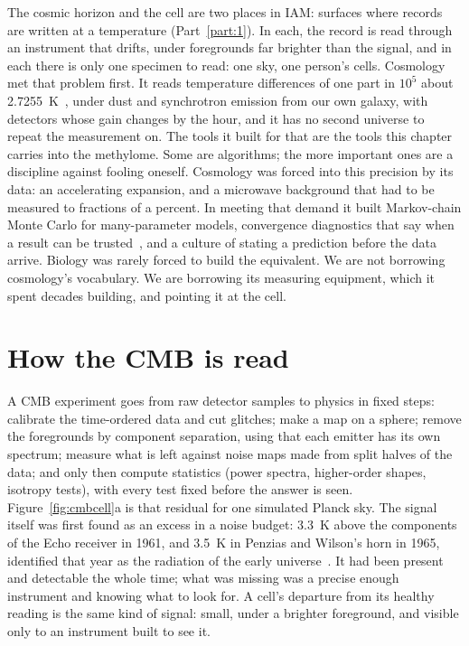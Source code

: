 The cosmic horizon and the cell are two places in IAM: surfaces where records are written at a temperature (Part~\ref{part:1}). In each, the record is
read through an instrument that drifts, under foregrounds far brighter than the signal, and in each there is only one specimen to read: one sky,
one person's cells. Cosmology met that problem first. It reads temperature differences of one part in $10^5$ about 2.7255~K~\cite{Fixsen2009}, under dust and
synchrotron emission from our own galaxy, with detectors whose gain changes by the hour, and it has no second universe to repeat the
measurement on. The tools it built for that are the tools this chapter carries into the methylome. Some are algorithms; the more important ones
are a discipline against fooling oneself.
Cosmology was forced into this precision by its data: an accelerating expansion, and a microwave background that had to be measured to
fractions of a percent. In meeting that demand it built Markov-chain Monte Carlo for many-parameter models, convergence diagnostics that
say when a result can be trusted~\cite{Gelman1992}, and a culture of stating a prediction before the data arrive. Biology was rarely forced
to build the equivalent. We are not borrowing cosmology's vocabulary. We are borrowing its measuring equipment, which it spent decades
building, and pointing it at the cell.

\section{How the CMB is read}

A CMB experiment goes from raw detector samples to physics in fixed steps: calibrate the time-ordered data and cut glitches; make a map on a sphere;
remove the foregrounds by component separation, using that each emitter has its own spectrum; measure what is left against noise maps made from
split halves of the data; and only then compute statistics (power spectra, higher-order shapes, isotropy tests), with every test fixed before
the answer is seen. Figure~\ref{fig:cmbcell}a is that residual for one simulated Planck sky.
The signal itself was first found as an excess in a noise budget: 3.3~K above the components of the Echo receiver in 1961, and 3.5~K in
Penzias and Wilson's horn in 1965, identified that year as the radiation of the early universe~\cite{Ohm1961,PenziasWilson1965,Dicke1965,Wilson1979}.
\observed{} It had been present and detectable the whole time; what was missing was a precise enough instrument and knowing what to look for.
A cell's departure from its healthy reading is the same kind of signal: small, under a brighter foreground, and visible only to an
instrument built to see it. \analogy

